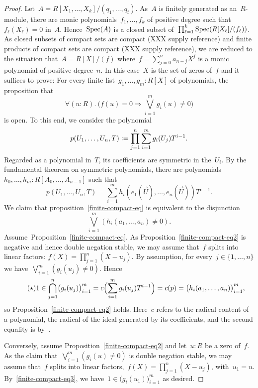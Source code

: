 \begin{proof}Let~$A = R[X_1,\ldots,X_k]/(q_1,\ldots,q_t)$. As~$A$ is finitely
generated as an~$R$-module, there are monic polynomials~$f_1,\ldots,f_k$ of
positive degree such that~$f_\ell(X_\ell) = 0$ in~$A$. Hence~$\operatorname{Spec}(A)$ is a
closed subset of~$\prod_{\ell=1}^k \operatorname{Spec}(R[X_\ell]/(f_\ell))$. As closed
subsets of compact sets are compact (XXX supply reference) and finite products
of compact sets are compact (XXX supply reference), we are reduced to the
situation that~$A = R[X]/(f)$ where~$f = \sum_{j=0}^n a_{n-j} X^j$ is a monic
polynomial of positive degree~$n$. In this case~$X$ is the set of zeros of~$f$
and it suffices to prove: For every finite list~$g_1,\ldots,g_m : R[X]$ of
polynomials, the proposition that
\begin{equation}\label{finite-compact-eq}
  \tag{$\dagger$}
  \forall(u : R).\ \bigl(f(u) = 0 \Rightarrow \bigvee_{i=1}^m g_i(u) \neq 0\bigr)
\end{equation}
is open. To this end, we consider the polynomial
\[ p(U_1,\ldots,U_n,T) \vcentcolon= \prod_{j=1}^n \sum_{i=1}^m g_i(U_j) T^{i-1}. \]
Regarded as a polynomial in~$T$, its coefficients are symmetric in the~$U_i$.
By the fundamental theorem on symmetric polynomials, there are
polynomials~$h_0,\ldots,h_m : R[A_0,\ldots,A_{n-1}]$ such that
\[ p(U_1,\ldots,U_n,T) = \sum_{i=1}^m h_i(e_1(\vec U),\ldots,e_n(\vec U)) T^{i-1}. \]
We claim that proposition~\eqref{finite-compact-eq} is equivalent to the
disjunction
\begin{equation}\label{finite-compact-eq2}
  \tag{$\ddagger$}
  \bigvee_{i=1}^m (h_i(a_1,\ldots,a_n) \neq 0).
\end{equation}
Assume~Proposition~\eqref{finite-compact-eq}. As
Proposition~\eqref{finite-compact-eq2} is negative and hence double
negation stable, we may assume that~$f$ splits into linear factors: $f(X) =
\prod_{j=1}^n (X-u_j)$. By assumption, for every~$j \in \{1,\ldots,n\}$ we
have~$\bigvee_{i=1}^m (g_i(u_j) \neq 0)$. Hence
\begin{equation}\label{finite-compact-eq3}
  \tag{$\star$}
  1 \in \bigcap_{j=1}^n \bigl(g_i(u_j)\bigr)_{i=1}^m = c\Bigl(\sum_{i=1}^m g_i(u_j) T^{i-1}\Bigr) =
  c(p) = \bigl(h_i(a_1,\ldots,a_n)\bigr)_{i=1}^m,
\end{equation}
so Proposition~\eqref{finite-compact-eq2} holds. Here~$c$ refers to the radical
content of a polynomial, the radical of the ideal generated by its
coefficients, and the second equality is
by~\cite[Proposition~1]{banaschewski-vermeulen:radical}.

Conversely, assume Proposition~\eqref{finite-compact-eq2} and let~$u : R$ be a
zero of~$f$. As the claim that~$\bigvee_{i=1}^m (g_i(u) \neq 0)$ is double
negation stable, we may assume that~$f$ splits into linear factors,~$f(X) =
\prod_{j=1}^n (X-u_j)$, with~$u_1 = u$. By~\eqref{finite-compact-eq3}, we
have~$1 \in \bigl(g_i(u_1)\bigr)_{i=1}^m$ as desired.
\end{proof}

